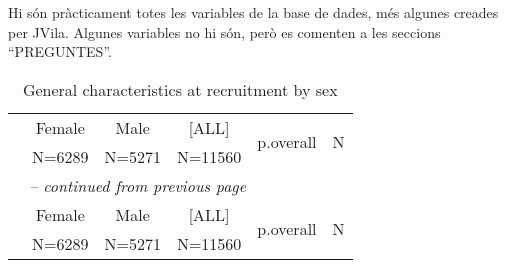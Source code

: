 \documentclass[a4paper,12pt, titlepage]{article}\usepackage[]{graphicx}\usepackage[]{color}
\begin{document}
Hi són pràcticament totes les variables de la base de dades, més algunes creades per JVila. Algunes variables no hi són, però es comenten a les seccions ``PREGUNTES''.

\newpage
\begin{landscape}
\begin{small}    
    \begin{longtable}{lccccc}\caption{General characteristics at recruitment by sex}\\
    \hline  
     &       Female        &        Male         &        [ALL]        & \multirow{2}{*}{p.overall} & \multirow{2}{*}{  N  }\\ 
 &       N=6289        &       N=5271        &       N=11560       &           &       \\ 
  
    \hline
    \hline     
    \endfirsthead 
    \multicolumn{6}{l}{\tablename\ \thetable{} \textit{-- continued from previous page}}\\ 
    \hline
     &       Female        &        Male         &        [ALL]        & \multirow{2}{*}{p.overall} & \multirow{2}{*}{  N  }\\ 
 &       N=6289        &       N=5271        &       N=11560       &           &       \\ 


\end{longtable}
\end{small}
\end{landscape}
\end{document}
